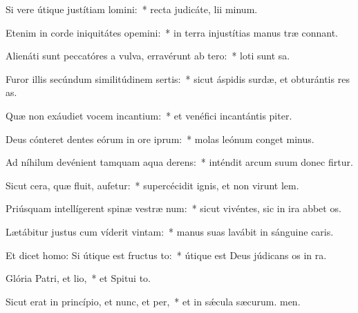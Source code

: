 \item Si vere útique justítiam lomini:~* recta judicáte, lii minum.
\item Etenim in corde iniquitátes opemini:~* in terra injustítias manus træ connant.
\item Alienáti sunt peccatóres a vulva, erravérunt ab tero:~* loti sunt sa.
\item Furor illis secúndum similitúdinem sertis:~* sicut áspidis surdæ, et obturántis res as.
\item Quæ non exáudiet vocem incantium:~* et venéfici incantántis piter.
\item Deus cónteret dentes eórum in ore iprum:~* molas leónum conget minus.
\item Ad níhilum devénient tamquam aqua derens:~* inténdit arcum suum donec firtur.
\item Sicut cera, quæ fluit, aufetur:~* supercécidit ignis, et non virunt lem.
\item Priúsquam intellígerent spinæ vestræ num:~* sicut vivéntes, sic in ira abbet os.
\item Lætábitur justus cum víderit vintam:~* manus suas lavábit in sánguine caris.
\item Et dicet homo: Si útique est fructus to:~* útique est Deus júdicans os in ra.
\item Glória Patri, et lio,~* et Spitui to.
\item Sicut erat in princípio, et nunc, et per,~* et in sǽcula sæcurum. men.
